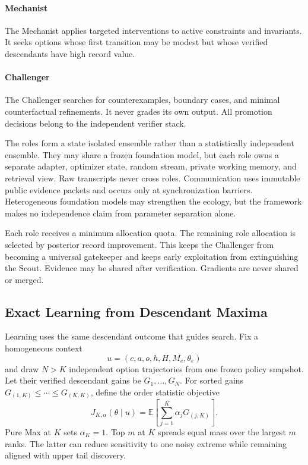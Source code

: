 \documentclass{article}
\begin{document}
\paragraph{Mechanist}
The Mechanist applies targeted interventions to active constraints and invariants. It seeks options whose first transition may be modest but whose verified descendants have high record value.

\paragraph{Challenger}
The Challenger searches for counterexamples, boundary cases, and minimal counterfactual refinements. It never grades its own output. All promotion decisions belong to the independent verifier stack.

The roles form a state isolated ensemble rather than a statistically independent ensemble. They may share a frozen foundation model, but each role owns a separate adapter, optimizer state, random stream, private working memory, and retrieval view. Raw transcripts never cross roles. Communication uses immutable public evidence packets and occurs only at synchronization barriers. Heterogeneous foundation models may strengthen the ecology, but the framework makes no independence claim from parameter separation alone.

Each role receives a minimum allocation quota. The remaining role allocation is selected by posterior record improvement. This keeps the Challenger from becoming a universal gatekeeper and keeps early exploitation from extinguishing the Scout. Evidence may be shared after verification. Gradients are never shared or merged.

\subsection{Exact Learning from Descendant Maxima}
\label{seclearning}

Learning uses the same descendant outcome that guides search. Fix a homogeneous context
\begin{equation}
u
=
(c,a,o,h,H,M_e,\theta_e)
\label{eqcontext}
\end{equation}
and draw $N>K$ independent option trajectories from one frozen policy snapshot. Let their verified descendant gains be $G_1,\ldots,G_N$. For sorted gains $G_{(1,K)}\leq\cdots\leq G_{(K,K)}$, define the order statistic objective
\begin{equation}
J_{K,\alpha}(\theta\mid u)
=
\mathbb E\!\left[
\sum_{j=1}^{K}\alpha_jG_{(j,K)}
\right].
\label{eqorderobjective}
\end{equation}
Pure Max at $K$ sets $\alpha_K=1$. Top $m$ at $K$ spreads equal mass over the largest $m$ ranks. The latter can reduce sensitivity to one noisy extreme while remaining aligned with upper tail discovery.
\end{document}
